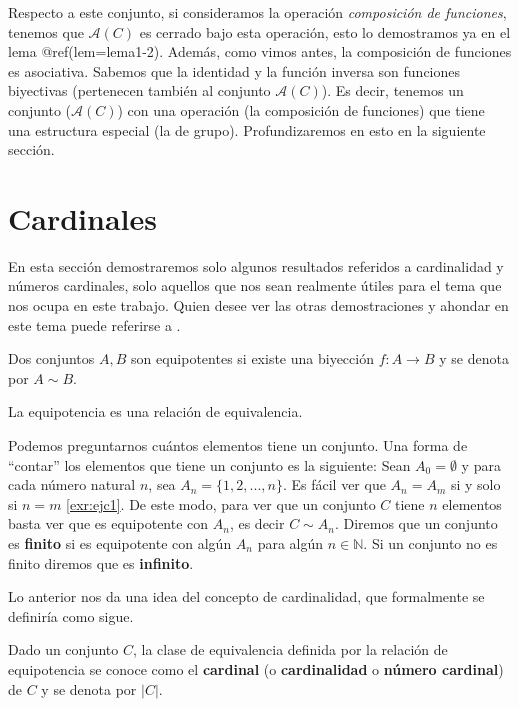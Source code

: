\documentclass[12pt,]{krantz}
\theoremstyle{definition}
\theoremstyle{definition}
\theoremstyle{definition}
\theoremstyle{remark}
\let\BeginKnitrBlock\begin \let\EndKnitrBlock\end
\begin{document}
Respecto a este conjunto, si consideramos la operación \emph{composición
de funciones}, tenemos que \(\mathcal{A}(C)\) es cerrado bajo esta
operación, esto lo demostramos ya en el lema @ref(lem=lema1-2). Además,
como vimos antes, la composición de funciones es asociativa. Sabemos que
la identidad y la función inversa son funciones biyectivas (pertenecen
también al conjunto \(\mathcal{A}(C)\)). Es decir, tenemos un conjunto
(\(\mathcal{A}(C)\)) con una operación (la composición de funciones) que
tiene una estructura especial (la de grupo). Profundizaremos en esto en
la siguiente sección.

\section{Cardinales}\label{cardinales}

En esta sección demostraremos solo algunos resultados referidos a
cardinalidad y números cardinales, solo aquellos que nos sean realmente
útiles para el tema que nos ocupa en este trabajo. Quien desee ver las
otras demostraciones y ahondar en este tema puede referirse a .

\BeginKnitrBlock{definition}
\protect\hypertarget{def:unnamed-chunk-44}{}{\label{def:unnamed-chunk-44}
}Dos conjuntos \(A, B\) son equipotentes si existe una biyección
\(f:A \longrightarrow B\) y se denota por \(A\sim B\).
\EndKnitrBlock{definition}

\BeginKnitrBlock{theorem}
\protect\hypertarget{thm:teo1-2}{}{\label{thm:teo1-2} }La equipotencia es
una relación de equivalencia.
\EndKnitrBlock{theorem}

Podemos preguntarnos cuántos elementos tiene un conjunto. Una forma de
``contar'' los elementos que tiene un conjunto es la siguiente: Sean
\(A_{0}=\emptyset\) y para cada número natural \(n\), sea
\(A_{n}=\{1,2,..., n\}\). Es fácil ver que \(A_{n}=A_{m}\) si y solo si
\(n=m\) \ref{exr:ejc1}. De este modo, para ver que un conjunto \(C\)
tiene \(n\) elementos basta ver que es equipotente con \(A_{n}\), es
decir \(C\sim A_{n}\). Diremos que un conjunto es \textbf{finito} si es
equipotente con algún \(A_{n}\) para algún \(n\in\mathbb{N}\). Si un
conjunto no es finito diremos que es \textbf{infinito}.

Lo anterior nos da una idea del concepto de cardinalidad, que
formalmente se definiría como sigue.

\BeginKnitrBlock{definition}
\protect\hypertarget{def:unnamed-chunk-45}{}{\label{def:unnamed-chunk-45}
}Dado un conjunto \(C\), la clase de equivalencia definida por la
relación de equipotencia se conoce como el \textbf{cardinal} (o
\textbf{cardinalidad} o \textbf{número cardinal}) de \(C\) y se denota
por \(|C|\).
\EndKnitrBlock{definition}
\end{document}
